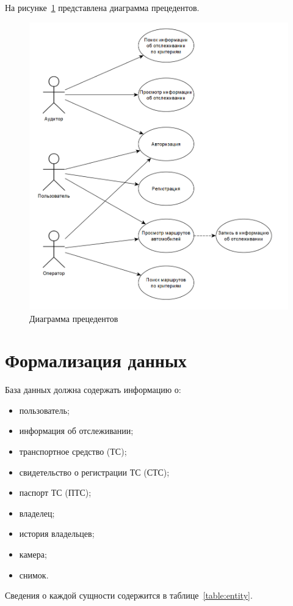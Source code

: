 На рисунке~\ref{fig:use-case} представлена диаграмма прецедентов.

\begin{figure}[H]
    \centering
    \includegraphics[width=0.8\linewidth]{images/diograms/use_case.png}
    \caption{Диаграмма прецедентов}
    \label{fig:use-case}
\end{figure}

\section{Формализация данных}

База данных должна содержать информацию о:

\begin{itemize}[label=---]
    \item пользователь;
    \item информация об отслеживании;
    \item транспортное средство (ТС);
    \item свидетельство о регистрации ТС (СТС); 
    \item паспорт ТС (ПТС);
    \item владелец;
    \item история владельцев;
    \item камера;
    \item снимок.
\end{itemize}

Сведения о каждой сущности содержится в таблице~\ref{table:entity}.

